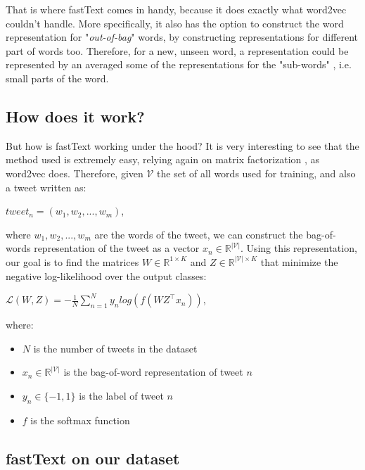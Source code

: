 \documentclass[10pt,conference,compsocconf]{IEEEtran}
\def\bR{\mathbb{R}}
\begin{document}
That is where fastText comes in handy, because it does exactly what word2vec couldn't handle. More specifically, it also has the option to construct the word representation for "\textit{out-of-bag}" words, by constructing representations for different part of words too. Therefore, for a new, unseen word, a representation could be represented by an averaged some of the representations for the "sub-words" \cite{BGJ16+}, i.e. small parts of the word. 

\subsection{How does it work?}

But how is fastText working under the hood? It is very interesting to see that the method used is extremely easy, relying again on matrix factorization \cite{LeS00}, as word2vec does. Therefore, given $\mathcal{V}$ the set of all words used for training, and also a tweet written as:
\begin{center}
	$tweet_n = (w_1, w_2,...,w_m)$,
\end{center}

where $w_1,w_2,...,w_m$ are the words of the tweet, we can construct the bag-of-words representation of the tweet as a vector $x_n \in \bR^{\mathcal{|V|}}$. Using this representation, our goal is to find the matrices $W \in \bR^{1\times K}$ and $Z \in \bR^{|\mathcal{V}| \times K}$ that minimize the negative log-likelihood over the output classes: 

\begin{center}
	$\mathcal{L}(W, Z) = - \frac{1}{N} \sum\limits_{n=1}^{N} y_n log (f(WZ^\top x_n))$,
\end{center}

where:

\begin{itemize}
	\item $N$ is the number of tweets in the dataset
	\item $x_n \in \bR^{|\mathcal{V}|}$ is the bag-of-word representation of tweet $n$
	\item $y_n \in \{-1, 1\}$ is the label of tweet $n$
	\item $f$ is the softmax function
\end{itemize}

\subsection{fastText on our dataset}
\end{document}
